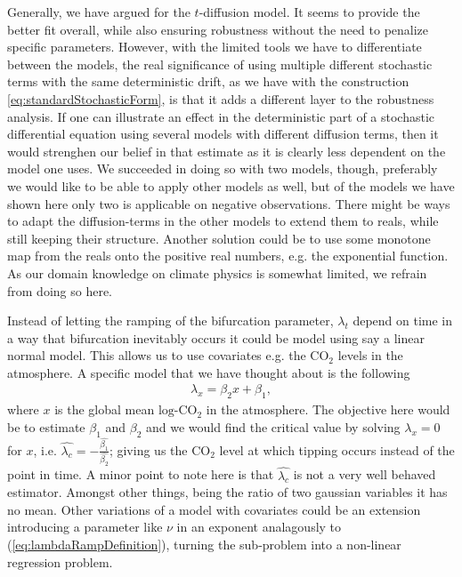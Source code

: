 Generally, we have argued for the $t$-diffusion model. It seems to provide the better fit overall, while also ensuring robustness without the need to penalize specific parameters. However, with the limited tools we have to differentiate between the models, the real significance of using multiple different stochastic terms with the same deterministic drift, as we have with the construction \ref{eq:standardStochasticForm}, is that it adds a different layer to the robustness analysis. If one can illustrate an effect in the deterministic part of a stochastic differential equation using several models with different diffusion terms, then it would strenghen our belief in that estimate as it is clearly less dependent on the model one uses. We succeeded in doing so with two models, though, preferably we would like to be able to apply other models as well, but of the models we have shown here only two is applicable on negative observations. There might be ways to adapt the diffusion-terms in the other models to extend them to reals, while still keeping their structure. Another solution could be to use some monotone map from the reals onto the positive real numbers, e.g. the exponential function. As our domain knowledge on climate physics is somewhat limited, we refrain from doing so here.

Instead of letting the ramping of the bifurcation parameter, $\lambda_t$ depend on time in a way that bifurcation inevitably occurs it could be model using say a linear normal model. This allows us to use covariates e.g. the $\mathrm{CO}_2$ levels in the atmosphere. A specific model that we have thought about is the following
\begin{align}
    \lambda_x= \beta_2 x + \beta_1, \label{eq:alternativeLambda}
\end{align}
where $x$ is the global mean $\mathrm{log}$-$\mathrm{CO}_2$ in the atmosphere. The objective here would be to estimate $\beta_1$ and $\beta_2$ and we would find the critical value by solving $\lambda_x = 0$ for $x$, i.e. $\hat{\lambda_c} = -\frac{\hat{\beta_1}}{\hat{\beta_2}}$; giving us the $\mathrm{CO}_2$ level at which tipping occurs instead of the point in time. A minor point to note here is that $\hat{\lambda_c}$ is not a very well behaved estimator. Amongst other things, being the ratio of two gaussian variables it has no mean. Other variations of a model with covariates could be an extension introducing a parameter like $\nu$ in an exponent analagously to (\ref{eq:lambdaRampDefinition}), turning the sub-problem into a non-linear regression problem. 


